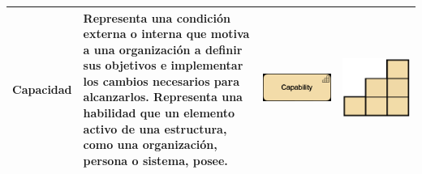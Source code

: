 \begin{longtable}{|p{0.15\linewidth}|p{0.45\linewidth}|p{0.2\linewidth} p{0.2\linewidth}|}
    Capacidad 
    &
    Representa una condición externa o interna que motiva a una organización a definir sus objetivos e implementar los cambios necesarios para alcanzarlos. Representa una habilidad que un elemento activo de una estructura, como una organización, persona o sistema, posee. 
    &
\begin{center}
    \includegraphics[width=1\linewidth]{imgs/capa_estrategia/fig-Capability-Notation_1.pdf}
\end{center} &
\begin{center}
    \includegraphics[width=0.5\linewidth]{imgs/capa_estrategia/fig-Capability-Notation_2.pdf}
\end{center}
    \\ \hline




\end{longtable}
